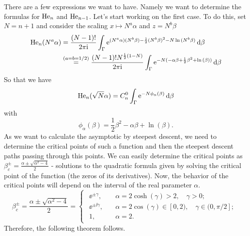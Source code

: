 There are a few expressions we want to have. Namely we want to determine the formulas for $\mathrm{He}_{n}$ and  $\mathrm{He}_{n-1}$.  Let's start working on the first case.  To do this, set $N = n + 1$ and consider the scaling $x \mapsto N^a \alpha$ and $z = N^b \beta$ 
\begin{equation}
	\begin{split}
		\mathrm{He}_n(N^a \alpha) & = \frac{(N-1)!}{2\pi \mathrm{i}} \int_{\Gamma} \operatorname{e}^{(N^a \alpha)(N^b \beta)- \frac{1}{2}(N^b \beta)^2 - N\ln{(N^b \beta)}} \mathrm{d} \beta \\
		& \stackrel{(a = b = 1/2)}{=}   \frac{(N-1)! N^{\frac{1}{2}\left(1-N\right)}}{2\pi \mathrm{i}} \int_{\Gamma}  \operatorname{e}^{-N(- \alpha \beta+ \frac{1}{2} \beta^2 + \ln{(\beta)})} \mathrm{d} \beta
	\end{split}
\end{equation}
So that we have
\begin{equation}
	\mathrm{He}_n(\sqrt{N}\alpha) = C_n^0 \int_{\Gamma}  \operatorname{e}^{-N \phi_\alpha(\beta) } \mathrm{d} \beta
	\label{Equation: Hermite Integral}
\end{equation}
with 
\begin{equation}
	\phi_\alpha(\beta) = \frac{1}{2} \beta^2 - \alpha \beta + \ln{(\beta)}.
\end{equation}
As we want to calculate the asymptotic by steepest descent, we need to determine the critical points of such a function and then the steepest descent paths passing through this points. We can easily determine the critical points as $\beta_c^\pm = \frac{\alpha \pm \sqrt{{\alpha}^2 - 4}}{2}$ - solutions to the quadratic formula given by solving the critical point of the function (the zeros of its derivatives). Now, the behavior of the critical points will depend on the interval of the real parameter $\alpha$. 
\begin{equation}
	\beta_c^{\pm} = \frac{\alpha \pm \sqrt{\alpha^2 - 4}}{2} =
	\begin{cases}
		\begin{aligned}
			\ee^{\pm \gamma}, \quad & \alpha = 2 \cosh{(\gamma)} > 2, \quad \gamma > 0; \\
			\ee^{\pm \ii \gamma}, \quad & \alpha = 2 \cos{(\gamma)} \in [0,2), \quad \gamma \in (0,\pi/2]; \\
			1, \quad & \alpha = 2.
		\end{aligned}
	\end{cases}
\end{equation}
Therefore, the following theorem follows.

